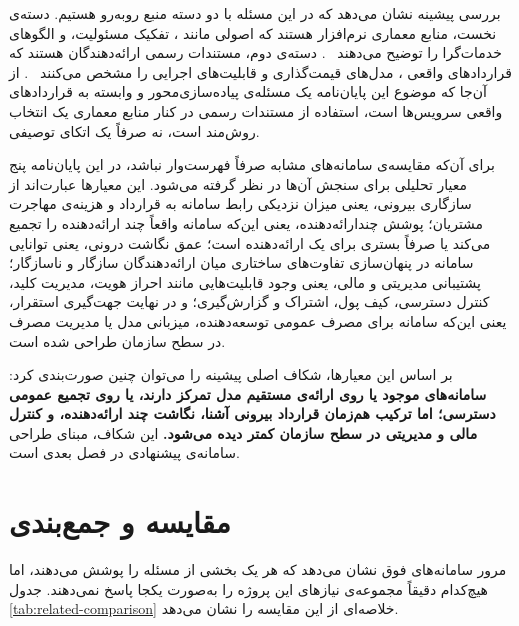 بررسی پیشینه نشان می‌دهد که در این مسئله با دو دسته منبع روبه‌رو هستیم.
دسته‌ی نخست، منابع معماری نرم‌افزار هستند که اصولی مانند ،
تفکیک مسئولیت، و الگوهای خدمات‌گرا را توضیح می‌دهند
~\cite{fielding2000,newman2015,richardson2018}. دسته‌ی دوم، مستندات رسمی
ارائه‌دهندگان هستند که قراردادهای واقعی ، مدل‌های قیمت‌گذاری و
قابلیت‌های اجرایی را مشخص می‌کنند
~\cite{openai2024,gemini2024,groq2024,openrouter2024,anyscale2024}. از آن‌جا
که موضوع این پایان‌نامه یک مسئله‌ی پیاده‌سازی‌محور و وابسته به قراردادهای
واقعی سرویس‌ها است، استفاده از مستندات رسمی در کنار منابع معماری یک انتخاب
روش‌مند است، نه صرفاً یک اتکای توصیفی.

برای آن‌که مقایسه‌ی سامانه‌های مشابه صرفاً فهرست‌وار نباشد، در این
پایان‌نامه پنج معیار تحلیلی برای سنجش آن‌ها در نظر گرفته می‌شود. این
معیارها عبارت‌اند از سازگاری بیرونی، یعنی میزان نزدیکی رابط سامانه به
قرارداد  و هزینه‌ی مهاجرت مشتریان؛ پوشش چندارائه‌دهنده، یعنی
این‌که سامانه واقعاً چند ارائه‌دهنده را تجمیع می‌کند یا صرفاً بستری برای
یک ارائه‌دهنده است؛ عمق نگاشت درونی، یعنی توانایی سامانه در پنهان‌سازی
تفاوت‌های ساختاری میان ارائه‌دهندگان سازگار و ناسازگار؛ پشتیبانی مدیریتی
و مالی، یعنی وجود قابلیت‌هایی مانند احراز هویت، مدیریت کلید، کنترل
دسترسی، کیف پول، اشتراک و گزارش‌گیری؛ و در نهایت جهت‌گیری استقرار، یعنی
این‌که سامانه برای مصرف عمومی توسعه‌دهنده، میزبانی مدل یا مدیریت مصرف در
سطح سازمان طراحی شده است.

بر اساس این معیارها، شکاف اصلی پیشینه را می‌توان چنین صورت‌بندی کرد:
\textbf{سامانه‌های موجود یا روی ارائه‌ی مستقیم مدل تمرکز دارند، یا روی
تجمیع عمومی دسترسی؛ اما ترکیب هم‌زمان قرارداد بیرونی آشنا، نگاشت چند
ارائه‌دهنده، و کنترل مالی و مدیریتی در سطح سازمان کمتر دیده می‌شود.}
این شکاف، مبنای طراحی سامانه‌ی پیشنهادی در فصل بعدی است.

\section{مقایسه و جمع‌بندی}

مرور سامانه‌های فوق نشان می‌دهد که هر یک بخشی از مسئله را پوشش می‌دهند،
اما هیچ‌کدام دقیقاً مجموعه‌ی نیازهای این پروژه را به‌صورت یکجا پاسخ
نمی‌دهند. جدول \ref{tab:related-comparison} خلاصه‌ای از این مقایسه را
نشان می‌دهد.

